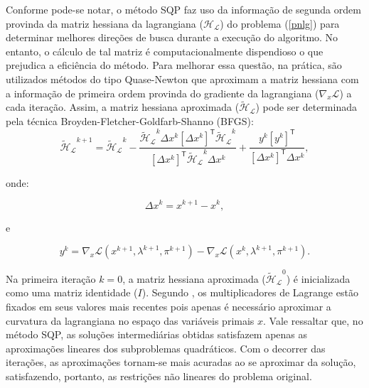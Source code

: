 \documentclass[
	12pt,				%
	openany,			%
	twoside,			%
	a4paper,			%
	chapter=TITLE,		%
	section=Title,		%
	subsection=Title,	%
	subsubsection=Title,%
	english,			%
	french,				%
	spanish,			%
	brazil			%
	]{abntex2}
\begin{document}
\begin{ERRATA}
Conforme pode-se notar, o método SQP faz uso da informação de segunda ordem provinda da matriz hessiana da lagrangiana ($\mathcal{H_L}$) do problema (\ref{pnlg}) para determinar melhores direções de busca durante a execução do algoritmo. No entanto, o cálculo de tal matriz é computacionalmente dispendioso o que prejudica a eficiência do método. Para melhorar essa questão, na prática, são utilizados métodos do tipo Quase-Newton que aproximam a matriz hessiana com a informação de primeira ordem provinda do gradiente da lagrangiana ($\nabla_x \mathcal{L}$) a cada iteração. Assim, a matriz hessiana aproximada ($\mathcal{\tilde{H}_{L}}$) pode ser determinada pela técnica Broyden-Fletcher-Goldfarb-Shanno (BFGS):
\pagebreak
\begin{equation}\label{hessiana}
    \mathcal{\tilde{H}_{L}}^{k+1} = \mathcal{\tilde{H}_{L}}^{k}- \frac{\mathcal{\tilde{H}_{L}}^{k}\Delta x^k[\Delta x^k]^\mathsf{T}\mathcal{\tilde{H}_{L}}^{k}}{[\Delta x^k]^\mathsf{T}\mathcal{\tilde{H}_{L}}^{k}\Delta x^k} + \frac{y^{k}[y^{k}]^\mathsf{T}}{[\Delta x^k]^\mathsf{T}\Delta x^k},
\end{equation}

\noindent onde:

\begin{equation}
    \Delta x^k = x^{k+1} - x^{k},
\end{equation}

\noindent e

\begin{equation}
    y^k = \nabla_x\mathcal{L}(x^{k+1}, \lambda^{k+1}, \pi^{k+1})  - \nabla_x\mathcal{L}(x^{k}, \lambda^{k+1}, \pi^{k+1}).
\end{equation}

Na primeira iteração $k=0$, a matriz hessiana aproximada ($\mathcal{\tilde{H}_{L}}^{0}$)  é inicializada como uma matriz identidade ($I$). Segundo , os multiplicadores de Lagrange estão fixados em seus valores mais recentes pois apenas é necessário aproximar a curvatura da lagrangiana no espaço das variáveis primais $x$. Vale ressaltar que, no método SQP, as soluções intermediárias obtidas satisfazem apenas as aproximações lineares dos subproblemas quadráticos. Com o decorrer das iterações, as aproximações tornam-se mais acuradas ao se aproximar da solução, satisfazendo, portanto, as restrições não lineares do problema original.


\end{ERRATA}
\end{document}
